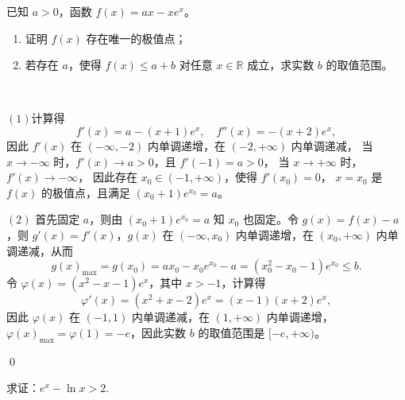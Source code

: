 \begin{example}[2021年天津]
    已知 $a > 0$，函数 $f(x) = ax - xe^x$。
\begin{enumerate}
    \item 证明 $f(x)$ 存在唯一的极值点；
    \item 若存在 $a$，使得 $f(x) \leqslant a + b$ 对任意 $x \in \mathbb{R}$ 成立，求实数 $b$ 的取值范围。
\end{enumerate}
\end{example}
\begin{jie}
    \ 

    \((1)\)计算得
    \[
    f'(x) = a - (x + 1)e^x, \quad f''(x) = -(x + 2)e^x,
    \]
    因此 $f'(x)$ 在 $(-\infty, -2)$ 内单调递增，在 $(-2, +\infty)$ 内单调递减，
    当 $x \to -\infty$ 时，$f'(x) \to a > 0$，且 $f'(-1) = a > 0$，
    当 $x \to +\infty$ 时，$f'(x) \to -\infty$，
    因此存在 $x_0 \in (-1, +\infty)$，使得 $f'(x_0) = 0$，
    $x = x_0$ 是 $f(x)$ 的极值点，且满足 $(x_0 + 1)e^{x_0} = a$。


    \((2)\)
    首先固定 $a$，则由 $(x_0 + 1)e^{x_0} = a$ 知 $x_0$ 也固定。令 $g(x) = f(x) - a$，则 $g'(x) = f'(x)$，$g(x)$ 在 $(-\infty, x_0)$ 内单调递增，在 $(x_0, +\infty)$ 内单调递减，从而
    \[g(x)_{\max} = g(x_0) = ax_0 - x_0e^{x_0} - a = (x_0^2 - x_0 - 1)e^{x_0} \leqslant b.\]
    令 $\varphi(x) = (x^2 - x - 1)e^x$，其中 $x > -1$，计算得
    \[\varphi'(x) = (x^2 + x - 2)e^x = (x - 1)(x + 2)e^x,\]
    因此 $\varphi(x)$ 在 $(-1, 1)$ 内单调递减，在 $(1, +\infty)$ 内单调递增，
    $\varphi(x)_{\max} = \varphi(1) = -e$，因此实数 $b$ 的取值范围是 $[-e, +\infty)$。

    \qed
\end{jie}

















\begin{example}
    求证：\(e^x-\ln x >2\).
\end{example}




















